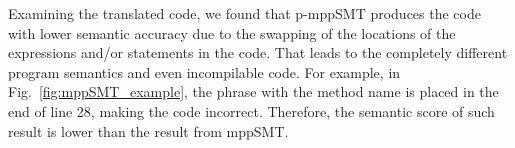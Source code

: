 %

Examining the translated code, we found that p-mppSMT produces the
code with lower semantic accuracy due to the swapping of the locations
of the expressions and/or statements in the code. That leads to the
completely different program semantics and even incompilable code. For
example, in Fig.~\ref{fig:mppSMT_example}, the phrase with the method
name  is placed in the end of line 28, making the code
incorrect. Therefore, the semantic score of such result is lower
than the result from mppSMT.

%




